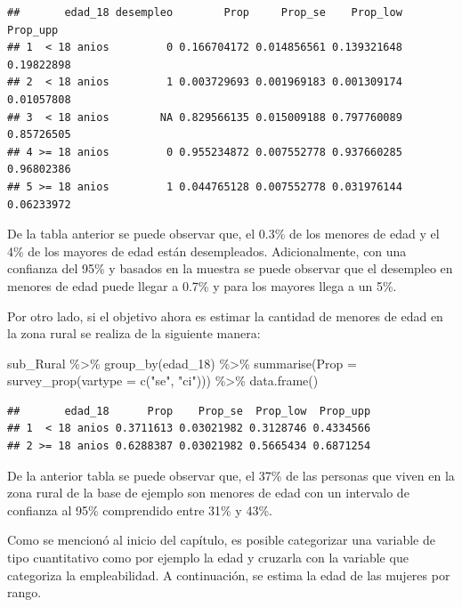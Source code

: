 \documentclass[
  12pt,
]{book}
\newenvironment{Shaded}{\begin{snugshade}}{\end{snugshade}}
\newcommand{\AttributeTok}[1]{\textcolor[rgb]{0.77,0.63,0.00}{#1}}
\newcommand{\FunctionTok}[1]{\textcolor[rgb]{0.00,0.00,0.00}{#1}}
\newcommand{\NormalTok}[1]{#1}
\newcommand{\SpecialCharTok}[1]{\textcolor[rgb]{0.00,0.00,0.00}{#1}}
\newcommand{\StringTok}[1]{\textcolor[rgb]{0.31,0.60,0.02}{#1}}
\begin{document}
\begin{verbatim}
##       edad_18 desempleo        Prop     Prop_se    Prop_low   Prop_upp
## 1  < 18 anios         0 0.166704172 0.014856561 0.139321648 0.19822898
## 2  < 18 anios         1 0.003729693 0.001969183 0.001309174 0.01057808
## 3  < 18 anios        NA 0.829566135 0.015009188 0.797760089 0.85726505
## 4 >= 18 anios         0 0.955234872 0.007552778 0.937660285 0.96802386
## 5 >= 18 anios         1 0.044765128 0.007552778 0.031976144 0.06233972
\end{verbatim}

De la tabla anterior se puede observar que, el 0.3\% de los menores de edad y el 4\% de los mayores de edad están desempleados. Adicionalmente, con una confianza del 95\% y basados en la muestra se puede observar que el desempleo en menores de edad puede llegar a 0.7\% y para los mayores llega a un 5\%.

Por otro lado, si el objetivo ahora es estimar la cantidad de menores de edad en la zona rural se realiza de la siguiente manera:

\begin{Shaded}
\begin{Highlighting}[]
\NormalTok{sub\_Rural }\SpecialCharTok{\%\textgreater{}\%} \FunctionTok{group\_by}\NormalTok{(edad\_18) }\SpecialCharTok{\%\textgreater{}\%} 
              \FunctionTok{summarise}\NormalTok{(}\AttributeTok{Prop =} \FunctionTok{survey\_prop}\NormalTok{(}\AttributeTok{vartype =}  \FunctionTok{c}\NormalTok{(}\StringTok{"se"}\NormalTok{, }\StringTok{"ci"}\NormalTok{))) }\SpecialCharTok{\%\textgreater{}\%}
              \FunctionTok{data.frame}\NormalTok{()}
\end{Highlighting}
\end{Shaded}

\begin{verbatim}
##       edad_18      Prop    Prop_se  Prop_low  Prop_upp
## 1  < 18 anios 0.3711613 0.03021982 0.3128746 0.4334566
## 2 >= 18 anios 0.6288387 0.03021982 0.5665434 0.6871254
\end{verbatim}

De la anterior tabla se puede observar que, el 37\% de las personas que viven en la zona rural de la base de ejemplo son menores de edad con un intervalo de confianza al 95\% comprendido entre 31\% y 43\%.

Como se mencionó al inicio del capítulo, es posible categorizar una variable de tipo cuantitativo como por ejemplo la edad y cruzarla con la variable que categoriza la empleabilidad. A continuación, se estima la edad de las mujeres por rango.
\end{document}
